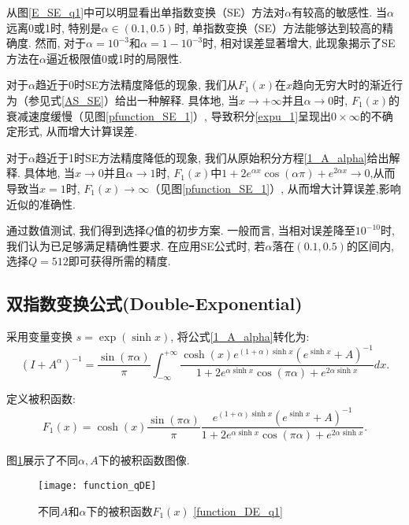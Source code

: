 从图\ref{E_SE_q1}中可以明显看出单指数变换（SE）方法对$\alpha$有较高的敏感性. 当$\alpha$远离0或1时, 特别是\(\alpha\in(0.1,0.5)\)时, 单指数变换（SE）方法能够达到较高的精确度. 然而, 对于$\alpha=10^{-3}$和$\alpha=1-10^{-3}$时, 相对误差显著增大, 此现象揭示了SE方法在$\alpha$逼近极限值0或1时的局限性. 

对于$\alpha$趋近于0时SE方法精度降低的现象, 我们从$F_1(x)$在$x$趋向无穷大时的渐近行为（参见式\eqref{AS_SE}）给出一种解释. 具体地, 当$x \rightarrow +\infty$并且$\alpha \rightarrow 0$时, $F_1(x)$的衰减速度缓慢（见图\ref{pfunction_SE_1}）, 导致积分\eqref{expu_1}呈现出$0\times \infty$的不确定形式, 从而增大计算误差. 

对于$\alpha$趋近于1时SE方法精度降低的现象, 我们从原始积分方程\eqref{1_A_alpha}给出解释. 具体地, 当$x \rightarrow 0$并且$\alpha \rightarrow 1$时, $F_1(x)$中\(1+2e^{\alpha x}\cos(\alpha \pi)+e^{2\alpha x}\rightarrow 0\),从而导致当\(x=1\)时, $F_1(x)\rightarrow \infty$（见图\ref{pfunction_SE_1}）, 从而增大计算误差,影响近似的准确性. 

通过数值测试, 我们得到选择$Q$值的初步方案. 一般而言, 当相对误差降至$10^{-10}$时, 我们认为已足够满足精确性要求. 在应用SE公式时, 若$\alpha$落在$(0.1,0.5)$的区间内, 选择$Q=512$即可获得所需的精度. 


\subsection{双指数变换公式(Double-Exponential)}
采用变量变换 $s=\exp(\sinh x)$, 将公式\eqref{1_A_alpha}转化为: 
\begin{equation}
	(I+{A}^{\alpha})^{-1}=\frac{\sin(\pi \alpha)}{\pi}\int_{-\infty}^{+\infty}
	\frac{\cosh(x)e^{(1+\alpha)\sinh x}(e^{\sinh x}+A)^{-1}}{1+2e^{ \alpha \sinh x}\cos(\pi\alpha)+e^{2\alpha\sinh x}}dx.
	\label{de_q1}
\end{equation}

定义被积函数: 
\begin{equation}\label{function_DE_q1}
	F_1(x)=\cosh(x) \frac{\sin(\pi \alpha)}{\pi} \frac{e^{(1+\alpha)\sinh x}(e^{\sinh x}+A)^{-1}}{1+2e^{ \alpha \sinh x}\cos(\pi\alpha)+e^{2\alpha\sinh x}}.
\end{equation}

图\ref{pfunction_DE_q1}展示了不同\(\alpha,A\)下的被积函数图像.
\begin{figure}[htbp]
	\centering
	\texttt{[image: function\_qDE]}
	\caption{不同$A$和$\alpha$下的被积函数$F_1(x)$ \eqref{function_DE_q1}}
	\label{pfunction_DE_q1}
\end{figure}

